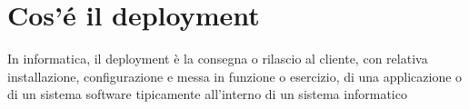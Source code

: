 \setlength{\parskip}{1em}

\section{Cos'é il deployment}

In informatica, il deployment è la consegna o rilascio al cliente, con relativa installazione, configurazione e messa in funzione o esercizio, di una applicazione o di un sistema software tipicamente all'interno di un sistema informatico


